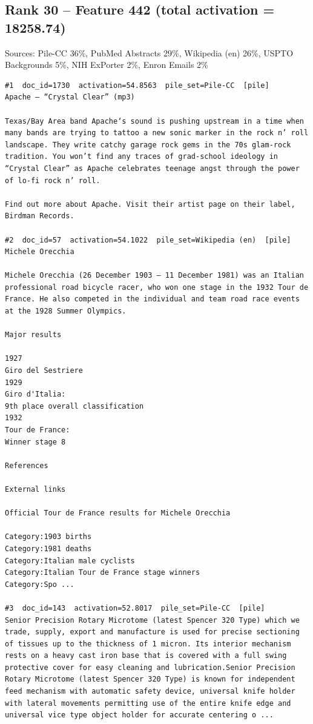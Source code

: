 \subsection*{Rank 30 -- Feature 442 (total activation = 18258.74)}

Sources: Pile-CC 36\%, PubMed Abstracts 29\%, Wikipedia (en) 26\%, USPTO Backgrounds 5\%, NIH ExPorter 2\%, Enron Emails 2\%

\begin{verbatim}
#1  doc_id=1730  activation=54.8563  pile_set=Pile-CC  [pile]
Apache – “Crystal Clear” (mp3)

Texas/Bay Area band Apache‘s sound is pushing upstream in a time when many bands are trying to tattoo a new sonic marker in the rock n’ roll landscape. They write catchy garage rock gems in the 70s glam-rock tradition. You won’t find any traces of grad-school ideology in “Crystal Clear” as Apache celebrates teenage angst through the power of lo-fi rock n’ roll.

Find out more about Apache. Visit their artist page on their label, Birdman Records.

#2  doc_id=57  activation=54.1022  pile_set=Wikipedia (en)  [pile]
Michele Orecchia

Michele Orecchia (26 December 1903 – 11 December 1981) was an Italian professional road bicycle racer, who won one stage in the 1932 Tour de France. He also competed in the individual and team road race events at the 1928 Summer Olympics.

Major results

1927
Giro del Sestriere
1929
Giro d'Italia:
9th place overall classification
1932
Tour de France:
Winner stage 8

References

External links

Official Tour de France results for Michele Orecchia

Category:1903 births
Category:1981 deaths
Category:Italian male cyclists
Category:Italian Tour de France stage winners
Category:Spo ...

#3  doc_id=143  activation=52.8017  pile_set=Pile-CC  [pile]
Senior Precision Rotary Microtome (latest Spencer 320 Type) which we trade, supply, export and manufacture is used for precise sectioning of tissues up to the thickness of 1 micron. Its interior mechanism rests on a heavy cast iron base that is covered with a full swing protective cover for easy cleaning and lubrication.Senior Precision Rotary Microtome (latest Spencer 320 Type) is known for independent feed mechanism with automatic safety device, universal knife holder with lateral movements permitting use of the entire knife edge and universal vice type object holder for accurate centering o ...


\end{verbatim}
